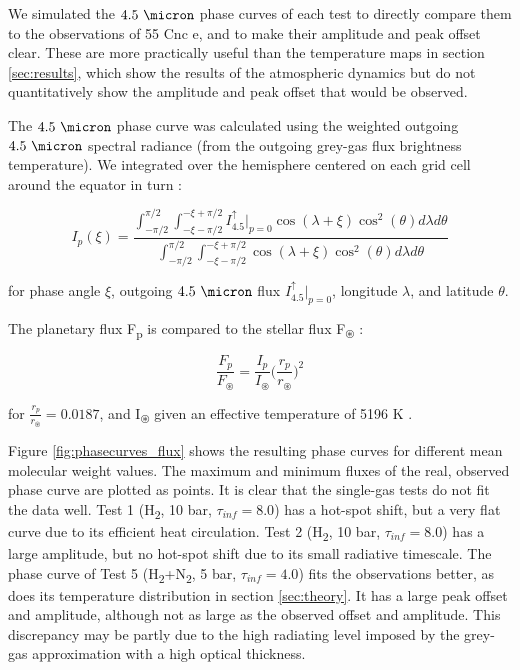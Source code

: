 
We simulated the $4.5\ \micron$ phase curves of each test to directly compare them to the observations of 55 Cnc e, and to make their amplitude and peak offset clear. These are more practically useful than the temperature maps in section \ref{sec:results}, which show the results of the atmospheric dynamics but do not quantitatively show the amplitude and peak offset that would be observed.

The $4.5\ \micron$ phase curve was calculated using the weighted outgoing $4.5\ \micron$ spectral radiance (from the outgoing grey-gas flux brightness temperature). We integrated over the hemisphere centered on each grid cell around the equator in turn \citep{cowan2008inverting}:

\begin{equation}
  I_{p}(\xi) = \frac{\int_{-\pi/2}^{\pi/2} \int_{-\xi-\pi/2}^{-\xi+\pi/2}I_{4.5}^{\uparrow}|_{p=0}\cos(\lambda+\xi)\cos^{2}(\theta)d \lambda d \theta}{\int_{-\pi/2}^{\pi/2} \int_{-\xi-\pi/2}^{-\xi+\pi/2}\cos(\lambda+\xi)\cos^{2}(\theta)d \lambda d \theta}
\end{equation}

for phase angle $\xi$, outgoing $4.5\ \micron$ flux $I_{4.5}^{\uparrow}|_{p=0}$, longitude $\lambda$, and latitude $\theta$.

The planetary flux F\textsubscript{p} is compared to the stellar flux F\textsubscript{$\circledast$} \citep{crossfield2012acme}:

\begin{equation}
  \frac{F_{p}}{F_{\circledast}} = \frac{I_{p}}{I_{\circledast}}\Big( \frac{r_{p}}{r_{\circledast}} \Big) ^{2}
\end{equation}

for $\frac{r_{p}}{r_{\circledast}} = 0.0187$, and I\textsubscript{$\circledast$} given an effective temperature of 5196 K \citep{von201155}.

Figure \ref{fig:phasecurves_flux} shows the resulting phase curves for different mean molecular weight values. The maximum and minimum fluxes of the real, observed phase curve are plotted as points. It is clear that the single-gas tests do not fit the data well. Test 1 (H\textsubscript{2}, 10 bar, $\tau_{inf} = 8.0$) has a hot-spot shift, but a very flat curve due to its efficient heat circulation. Test 2 (H\textsubscript{2}, 10 bar, $\tau_{inf} = 8.0$) has a large amplitude, but no hot-spot shift due to its small radiative timescale. The phase curve of Test 5 (H\textsubscript{2}+N\textsubscript{2}, 5 bar, $\tau_{inf} = 4.0$) fits the observations better, as does its temperature distribution in section \ref{sec:theory}. It has a large peak offset and amplitude, although not as large as the observed offset and amplitude. This discrepancy may be partly due to the high radiating level imposed by the grey-gas approximation with a high optical thickness.


